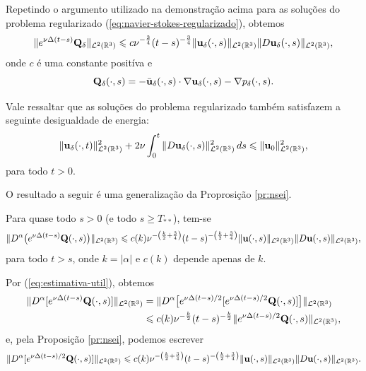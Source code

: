 Repetindo o argumento utilizado na demonstração acima para as soluções do problema regularizado (\ref{eq:navier-stokes-regularizado}), obtemos
\begin{equation} \label{eq:2.11}
    \Vert e^{\nu\Delta(t-s)} \mathbf{Q}_\delta \Vert_{\mathcal{L}^2(\mathbb{R}^3)} \leqslant c \nu^{-\frac{3}{4}}(t - s)^{-\frac{3}{4}} \Vert \mathbf{u}_\delta(\cdot,s) \Vert_{\mathcal{L}^2(\mathbb{R}^3)} \Vert D\mathbf{u}_\delta(\cdot,s) \Vert_{\mathcal{L}^2(\mathbb{R}^3)},
\end{equation}
onde $c$ é uma constante positíva e
\[
    \mathbf{Q}_\delta(\cdot,s) = -\bar{\mathbf{u}}_\delta(\cdot,s) \cdot \nabla \mathbf{u}_\delta(\cdot,s) - \nabla p_\delta(\cdot,s).
\]

\obs Vale ressaltar que as soluções do problema regularizado também satisfazem a seguinte desigualdade de energia:
\begin{equation} \label{eq:desigualdade-de-energia-regularizado}
    \Vert \mathbf{u}_\delta(\cdot,t) \Vert_{\mathcal{L}^2(\mathbb{R}^3)}^2 + 2\nu \int_0^t \Vert D\mathbf{u}_\delta(\cdot,s) \Vert^2_{\mathcal{L}^2(\mathbb{R}^3)} \,ds \leqslant \Vert \mathbf{u}_0 \Vert_{\mathcal{L}^2(\mathbb{R}^3)}^2,
\end{equation}
para todo $t > 0$.

O resultado a seguir é uma generalização da Proprosição \ref{pr:nsei}.

\begin{pbox} \label{pr:DaQ}
    Para quase todo $s > 0$ (e todo $s \geqslant T_{**}$), tem-se
    \[
        \Vert D^{\alpha} \big( e^{\nu\Delta(t-s)}\mathbf{Q}(\cdot,s)\big) \Vert_{\mathcal{L}^2(\mathbb{R}^3)} \leqslant c(k) \nu^{-\left( \frac{k}{2} + \frac{3}{4} \right)} (t - s)^{-\left( \frac{k}{2} + \frac{3}{4}\right)} \Vert \mathbf{u}(\cdot,s) \Vert_{\mathcal{L}^2(\mathbb{R}^3)} \Vert D\mathbf{u}(\cdot,s) \Vert_{\mathcal{L}^2(\mathbb{R}^3)},
    \]
    para todo $t > s$, onde $k = |\alpha|$ e $c(k)$ depende apenas de $k$.
\end{pbox}
\begin{prf}
    Por (\ref{eq:estimativa-util}), obtemos
    \[
        \begin{aligned}
            \Vert D^\alpha [e^{\nu \Delta (t - s)} \mathbf{Q}(\cdot,s)] \Vert_{\mathcal{L}^2(\mathbb{R}^3)} &= \Vert D^\alpha \big[e^{\nu \Delta (t - s)/2} [ e^{\nu \Delta (t - s)/2} \mathbf{Q}(\cdot,s) ] \big] \Vert_{\mathcal{L}^2(\mathbb{R}^3)}\\ 
            &\leqslant c(k) \nu^{-\frac{k}{2}} (t - s)^{-\frac{k}{2}} \Vert e^{\nu\Delta(t-s)/2} \mathbf{Q}(\cdot,s) \Vert_{\mathcal{L}^2(\mathbb{R}^3)},
        \end{aligned}
    \]
    e, pela Proposição \ref{pr:nsei}, podemos escrever
    \[
        \Vert D^\alpha [e^{\nu \Delta (t - s)/2} \mathbf{Q}(\cdot,s)] \Vert_{\mathcal{L}^2(\mathbb{R}^3)} \leqslant c(k) \nu^{-\left( \frac{k}{2} + \frac{3}{4} \right)} (t - s)^{-\left( \frac{k}{2} + \frac{3}{4} \right)} \Vert \mathbf{u}(\cdot,s) \Vert_{\mathcal{L}^2(\mathbb{R}^3)} \Vert D\mathbf{u}(\cdot,s) \Vert_{\mathcal{L}^2(\mathbb{R}^3)}.
    \]
\end{prf}

